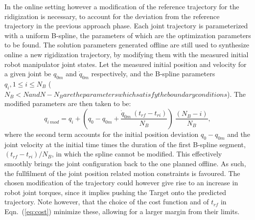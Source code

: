 In the online setting however a modification of the reference trajectory for the ridigization is necessary, to account for the deviation from the reference trajectory in the previous approach phase. Each joint trajectory is parameterized with a uniform B-spline, the parameters of which are the optimization parameters to be found. The solution parameters generated offline are still used to synthesize online a new rigidization trajectory, by modifying them with the measured initial robot manipulator joint states. Let the measured initial position and velocity for a given joint be $q_{0m}$ and $\dot{q}_{0m}$ respectively, and the B-spline parameters $q_i, 1 \leq i \leq N_B$ ($N_B<N and N-N_B are the parameters which satisfy the boundary conditions$). The modified parameters are then taken to be:
\begin{equation}
q_{i \: mod} =   q_i +  \left( q_0 - q_{0m} + \frac{\dot{q}_{0m} \: ({t_{rf}}-{t_{ri}})}{N_B} \right) \: \frac{(N_B-i)}{N_B},
\end{equation}
where the second term accounts for the initial position deviation $q_0 - q_{0m}$ and the joint velocity at the initial time times the duration of the first B-spline segment, $({t_{rf}}-{t_{ri}})/N_B$, in which the spline cannot be modified. This effectively smoothly brings the joint configuration back to the one planned offline. As such, the fullfilment of the joint position related motion constraints is favoured. The chosen modification of the trajectory could however give rise to an increase in robot joint torques, since it implies pushing the Target onto the predicted trajectory. Note however, that the choice of the cost function and of $t_{rf}$ in Eqn.~(\ref{eq:cost}) minimize these, allowing for a larger margin from their limits.
%
